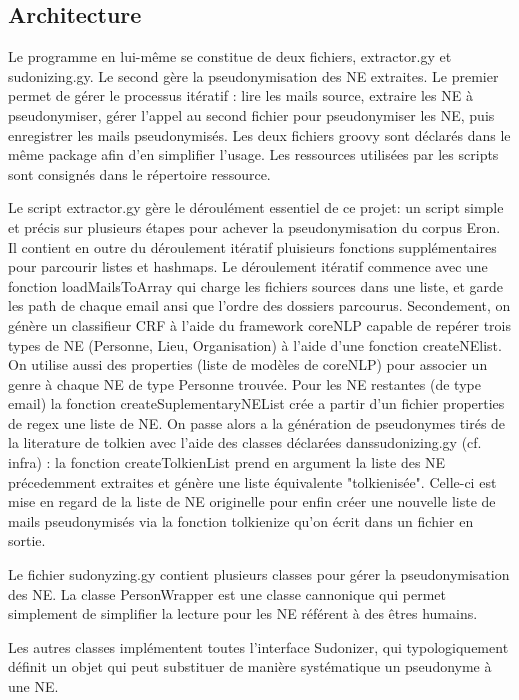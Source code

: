 \documentclass{article}
\begin{document}
\subsection{Architecture}
\par
Le programme en lui-même se constitue de deux fichiers, extractor.gy et sudonizing.gy.
Le second gère la pseudonymisation des NE extraites.
Le premier permet de gérer le processus itératif : lire les mails source, extraire les NE à pseudonymiser, gérer l'appel au second fichier pour pseudonymiser les NE, puis enregistrer les mails pseudonymisés.
Les deux fichiers groovy sont déclarés dans le même package afin d'en simplifier l'usage.
Les ressources utilisées par les scripts sont consignés dans le répertoire ressource.
\par
Le script extractor.gy gère le déroulément essentiel de ce projet: un script simple et précis sur plusieurs étapes pour achever la pseudonymisation du corpus Eron.
Il contient en outre du déroulement itératif pluisieurs fonctions supplémentaires pour parcourir listes et hashmaps.
Le déroulement itératif commence avec une fonction loadMailsToArray qui charge les fichiers sources dans une liste, et garde les path de chaque email ansi que l'ordre des dossiers parcourus.
Secondement, on génère un classifieur CRF à l'aide du framework coreNLP capable de repérer trois types de NE (Personne, Lieu, Organisation) à l'aide d'une fonction createNElist.
On utilise aussi des properties (liste de modèles de coreNLP) pour associer un genre à chaque NE de type Personne trouvée.
Pour les NE restantes (de type email) la fonction createSuplementaryNEList crée a partir d'un fichier properties de regex une liste de NE. 
On passe alors a la génération de pseudonymes tirés de la literature de tolkien avec l'aide des classes déclarées danssudonizing.gy (cf. infra) : la fonction createTolkienList prend en argument la liste des NE précedemment extraites et génère une liste équivalente "tolkienisée". 
Celle-ci est mise en regard de la liste de NE originelle pour enfin créer une nouvelle liste de mails pseudonymisés via la fonction tolkienize qu'on écrit dans un fichier en sortie.
\par
Le fichier sudonyzing.gy contient plusieurs classes pour gérer la pseudonymisation des NE.
La classe PersonWrapper est une classe cannonique qui permet simplement de simplifier la lecture pour les NE référent à des êtres humains.
\par
Les autres classes implémentent toutes l'interface Sudonizer, qui typologiquement définit un objet qui peut substituer de manière systématique un pseudonyme à une NE.
\end{document}
